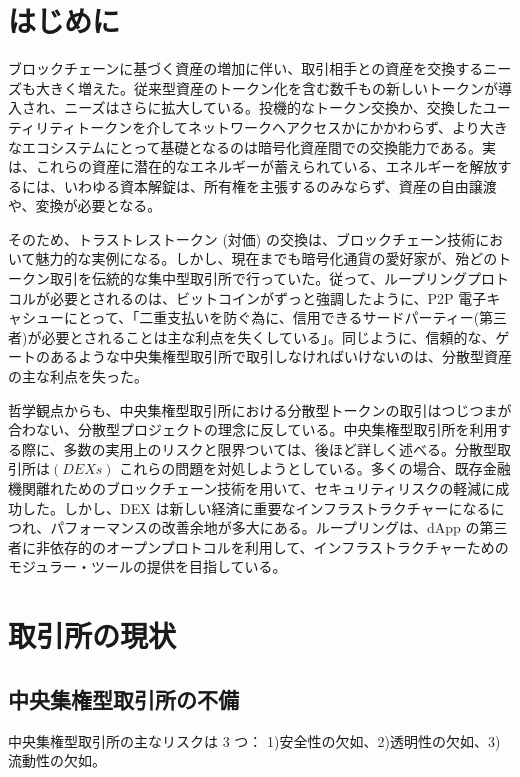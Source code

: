\documentclass{article}
\begin{document}
\begin{multicols}{2}
\section{はじめに\label{sec:introduction}}
ブロックチェーンに基づく資産の増加に伴い、取引相手との資産を交換するニーズも大きく増えた。従来型資産のトークン化を含む数千もの新しいトークンが導入され、ニーズはさらに拡大している。投機的なトークン交換か、交換したユーティリティトークンを介してネットワークへアクセスかにかかわらず、より大きなエコシステムにとって基礎となるのは暗号化資産間での交換能力である。実は、これらの資産に潜在的なエネルギー\cite{desotocapital}が蓄えられている、エネルギーを解放するには、いわゆる資本解錠は、所有権を主張するのみならず、資産の自由譲渡や、変換が必要となる。

そのため、トラストレストークン (対価) の交換は、ブロックチェーン技術において魅力的な実例になる。しかし、現在までも暗号化通貨の愛好家が、殆どのトークン取引を伝統的な集中型取引所で行っていた。従って、ループリングプロトコルが必要とされるのは、ビットコイン\cite{desotocapital}がずっと強調したように、P2P 電子キャシューにとって、「二重支払いを防ぐ為に、信用できるサードパーティー(第三者)が必要とされることは主な利点を失くしている」。同じように、信頼的な、ゲートのあるような中央集権型取引所で取引しなければいけないのは、分散型資産の主な利点を失った。

哲学観点からも、中央集権型取引所における分散型トークンの取引はつじつまが合わない、分散型プロジェクトの理念に反している。中央集権型取引所を利用する際に、多数の実用上のリスクと限界ついては、後ほど詳しく述べる。分散型取引所は$(DEXs)$ \cite{schuh2015bitshares} \cite{bancor} \cite{kyber} これらの問題を対処しようとしている。多くの場合、既存金融機関離れためのブロックチェーン技術を用いて、セキュリティリスクの軽減に成功した。しかし、DEX は新しい経済に重要なインフラストラクチャーになるにつれ、パフォーマンスの改善余地が多大にある。ループリングは、dApp の第三者に非依存的のオープンプロトコルを利用して、インフラストラクチャーためのモジュラー・ツールの提供を目指している。

\section{取引所の現状\label{sec:current_exchange_landscape}}

\subsection{中央集権型取引所の不備}
中央集権型取引所の主なリスクは 3 つ： 1)安全性の欠如、2)透明性の欠如、3)流動性の欠如。


\end{multicols}
\end{document}

